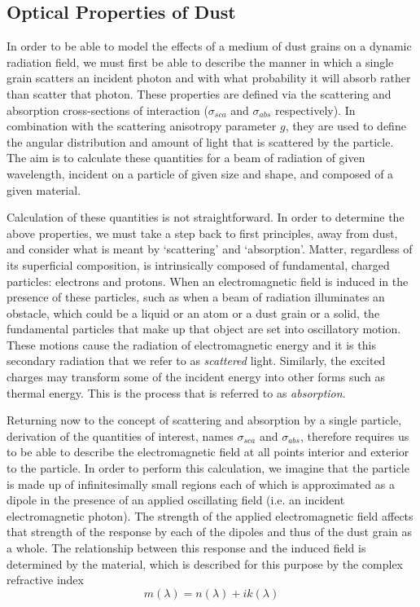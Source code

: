 \subsection{Optical Properties of Dust}

In order to be able to model the effects of a medium of dust grains on a dynamic radiation field, we must first be able to describe the manner in which a single grain scatters an incident photon and with what probability it will absorb rather than scatter that photon. These properties are defined via the scattering and absorption cross-sections of interaction ($\sigma_{sca}$ and $\sigma_{abs}$ respectively).  In combination with the scattering anisotropy parameter $g$, they are used to define the angular distribution and amount of  light that is scattered by the particle.  The aim is to calculate these quantities for a beam of radiation of given wavelength, incident on a particle of given size and shape, and composed of a given material.   

Calculation of these quantities is not straightforward.  In order to determine the above properties, we must take a step back to first principles, away from dust, and consider what is meant by `scattering' and `absorption'.  Matter, regardless of its superficial composition, is intrinsically composed of fundamental, charged particles: electrons and protons.  When an electromagnetic field is induced in the presence of these particles, such as when a beam of radiation illuminates an obstacle, which could be a liquid or an atom or a dust grain or a solid, the fundamental particles that make up that object are set into oscillatory motion.  These motions cause the radiation of electromagnetic energy and it is this secondary radiation that we refer to as \textit{scattered} light.  Similarly, the excited charges may transform some of the incident energy into other forms such as thermal energy.  This is the process that is referred to as \textit{absorption}.

Returning now to the concept of scattering and absorption by a single particle, derivation of the quantities of interest, names $\sigma_{sca}$ and $\sigma_{abs}$, therefore requires us to be able to describe the electromagnetic field at all points interior and exterior to the particle.  In order to perform this calculation, we imagine that the particle is made up of infinitesimally small regions each of which is approximated as a dipole in the presence of an applied oscillating field (i.e. an incident electromagnetic photon).  The strength of the applied electromagnetic field affects that strength of the response by each of the dipoles and thus of the dust grain as a whole.  The relationship between this response and the induced field is determined by the material, which is described for this purpose by the complex refractive index 
\begin{equation}
m(\lambda)=n(\lambda)+ik(\lambda)
\end{equation}

